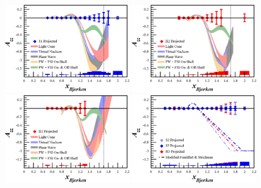 \begin{figure}
\begin{center}
\includegraphics[width=0.49\textwidth]{figs/Azz_S1.eps}
\includegraphics[width=0.49\textwidth]{figs/Azz_H2.eps}
\includegraphics[width=0.49\textwidth]{figs/Azz_H1.eps}
\includegraphics[width=0.49\textwidth]{figs/Azz_S2_H3_S3.eps} 

\end{center}
\end{figure}
